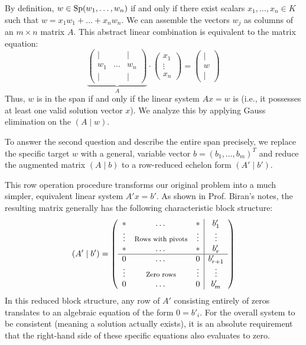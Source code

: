 \begin{answer}
By definition, $w \in \operatorname{Sp}(w_{1}, \dots, w_{n})$ if and only if there exist scalars $x_{1}, \dots, x_{n} \in K$ such that $w = x_{1} w_{1} + \dots + x_{n} w_{n}$. We can assemble the vectors $w_{j}$ as columns of an $m \times n$ matrix $A$. This abstract linear combination is equivalent to the matrix equation:
\[
\underbrace{\begin{pmatrix} | & & | \\ w_{1} & \dots & w_{n} \\ | & & | \end{pmatrix}}_{A} \cdot \begin{pmatrix} x_{1} \\ \vdots \\ x_{n} \end{pmatrix} = \begin{pmatrix} | \\ w \\ | \end{pmatrix}
\]
Thus, $w$ is in the span if and only if the linear system $Ax = w$ is  (i.e., it possesses at least one valid solution vector $x$). We analyze this by applying Gauss elimination on the  $(A \mid w)$. 

To answer the second question and describe the entire span precisely, we replace the specific target $w$ with a general, variable vector $b = (b_{1}, \dots, b_{m})^{T}$ and reduce the augmented matrix $(A \mid b)$ to a row-reduced echelon form $(A' \mid b')$. 

This row operation procedure transforms our original problem into a much simpler, equivalent linear system $A'x = b'$. As shown in Prof. Biran's notes, the resulting matrix generally has the following characteristic block structure:
\begin{equation}
\label{eq:block_consistency}
(A' \mid b') = \left( 
\begin{array}{ccc|c}
* & \dots & * & b'_{1} \\
\vdots & \text{\footnotesize Rows with pivots} & \vdots & \vdots \\
* & \dots & * & b'_{r} \\ \hline
0 & \dots & 0 & b'_{r+1} \\
\vdots & \text{\footnotesize Zero rows} & \vdots & \vdots \\
0 & \dots & 0 & b'_{m}
\end{array} 
\right)
\end{equation}
In this reduced block structure, any row of $A'$ consisting entirely of zeros translates to an algebraic equation of the form $0 = b'_{i}$. For the overall system to be consistent (meaning a solution actually exists), it is an absolute requirement that the right-hand side of these specific equations also evaluates to zero. 


\end{answer}
